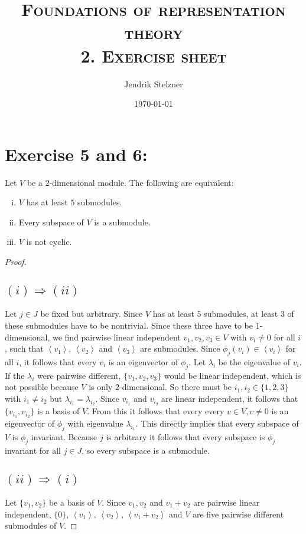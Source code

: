 \documentclass[a4paper,10pt]{article}
\title{\textsc{Foundations of representation theory \\ \Large 2. Exercise sheet}}
\author{Jendrik Stelzner}
\date{\today}
\newcommand{\gen}[1]{\left\langle#1\right\rangle}
\begin{document}
\maketitle

\section*{Exercise 5 and 6:}
Let $V$ be a $2$-dimensional module. The following are equivalent:
\begin{enumerate}[(i)]
 \item $V$ has at least $5$ submodules.
 \item Every subspace of $V$ is a submodule.
 \item $V$ is not cyclic.
\end{enumerate}

\begin{proof}
\subsection*{$(i) \Rightarrow (ii)$}\addtocounter{section}{2}
Let $j \in J$ be fixed but arbitrary.
Since $V$ has at least $5$ submodules, at least $3$ of these submodules have to be nontrivial. Since these three have to be $1$-dimensional, we find pairwise linear independent $v_1, v_2, v_3 \in V$ with $v_i \neq 0$ for all $i$, such that $\gen{v_1}$, $\gen{v_2}$ and $\gen{v_3}$ are submodules. Since $\phi_j(v_i) \in \gen{v_i}$ for all $i$, it follows that every $v_i$ is an eigenvector of $\phi_j$. Let $\lambda_i$ be the eigenvalue of $v_i$. If the $\lambda_i$ were pairwise different, $\{v_1, v_2, v_3\}$ would be linear independent, which is not possible because $V$ is only $2$-dimensional. So there must be $i_1, i_2 \in \{1,2,3\}$ with $i_1 \neq i_2$ but $\lambda_{i_1} = \lambda_{i_2}$. Since $v_{i_1}$ and $v_{i_2}$ are linear independent, it follows that $\{v_{i_1}, v_{i_{2}}\}$ is a basis of $V$. From this it follows that every every $v \in V, v \neq 0$ is an eigenvector of $\phi_j$ with eigenvalue $\lambda_{i_1}$. This directly implies that every subspace of $V$ is $\phi_j$ invariant. Because $j$ is arbitrary it follows that every subspace is $\phi_j$ invariant for all $j \in J$, so every subspace is a submodule.

\subsection*{$(ii) \Rightarrow (i)$}
Let $\{v_1, v_2\}$ be a basis of $V$. Since $v_1, v_2$ and $v_1+v_2$ are pairwise linear independent, $\{0\}$, $\gen{v_1}$, $\gen{v_2}$, $\gen{v_1+v_2}$ and $V$ are five pairwise different submodules of $V$.


\end{proof}
\end{document}
